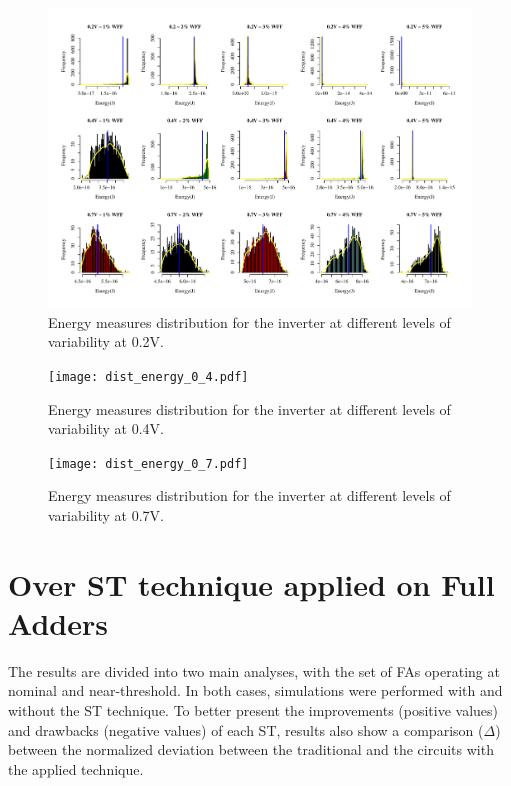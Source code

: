 \documentclass[pgmicro,mestrado,english]{iiufrgs}
\begin{document}
     \begin{figure}[]
        \centering
            \includegraphics[width=1\textwidth, trim={0cm 0cm 0cm 0cm}, clip]{dist_energy_0_2.pdf}
            \caption{Energy measures distribution for the inverter at different levels of variability at 0.2V.}
        \label{fig:energyDist0_2}
    \end{figure}   
    
    \begin{figure}[]
        \centering
            \texttt{[image: dist\_energy\_0\_4.pdf]}
            \caption{Energy measures distribution for the inverter at different levels of variability at 0.4V.}
        \label{fig:energyDist0_4}
    \end{figure}   
    
         \begin{figure}[]
        \centering
            \texttt{[image: dist\_energy\_0\_7.pdf]}
            \caption{Energy measures distribution for the inverter at different levels of variability at 0.7V.}
        \label{fig:energyDist0_7}
    \end{figure}   
    
\section{Over ST technique applied on Full Adders}

The results are divided into two main analyses, with the set of FAs operating at nominal and near-threshold. In both cases, simulations were performed with and without the ST technique. To better present the improvements (positive values) and drawbacks (negative values) of each ST, results also show a comparison ($\Delta$) between the normalized deviation between the traditional and the circuits with the applied technique.
\end{document}
